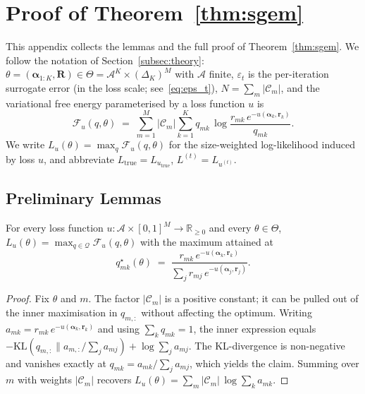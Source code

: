 \section{Proof of Theorem~\ref{thm:sgem}}
\label{sec:proof}

This appendix collects the lemmas and the full proof of
Theorem~\ref{thm:sgem}. We follow the notation of
Section~\ref{subsec:theory}: $\theta = (\boldsymbol{\alpha}_{1:K}, \mathbf{R})
\in \Theta = \mathcal{A}^K \times (\Delta_K)^M$ with $\mathcal{A}$
finite, $\varepsilon_t$ is the per-iteration surrogate error
(in the loss scale; see~\eqref{eq:eps_t}), $N = \sum_m |\mathcal{C}_m|$,
and the variational free energy
parameterised by a loss function $u$ is
\begin{equation*}
\mathcal{F}_u(q, \theta) \;=\; \sum_{m=1}^{M} |\mathcal{C}_m|
\sum_{k=1}^{K} q_{mk}\, \log \frac{r_{mk}\, e^{-u(\boldsymbol{\alpha}_k, \mathbf{r}_k)}}{q_{mk}}.
\end{equation*}
We write $L_u(\theta) = \max_q \mathcal{F}_u(q, \theta)$ for the
size-weighted log-likelihood induced by loss $u$, and abbreviate
$L_{\mathrm{true}} = L_{u_{\mathrm{true}}}$,
$L^{(t)} = L_{u^{(t)}}$.

\subsection{Preliminary Lemmas}

\begin{proposition}
\label{prop:elbo}
For every loss function $u: \mathcal{A} \times [0, 1]^M \to \mathbb{R}_{\geq 0}$
and every $\theta\in\Theta$,
$L_u(\theta) = \max_{q\in\mathcal{Q}} \mathcal{F}_u(q, \theta)$ with
the maximum attained at
\begin{equation*}
q^{\star}_{mk}(\theta) \;=\; \frac{r_{mk}\,e^{-u(\boldsymbol{\alpha}_k, \mathbf{r}_k)}}
{\sum_{j} r_{mj}\,e^{-u(\boldsymbol{\alpha}_j, \mathbf{r}_j)}}.
\end{equation*}
\end{proposition}

\begin{proof}
Fix $\theta$ and $m$. The factor $|\mathcal{C}_m|$ is a positive
constant; it can be pulled out of the inner maximisation in $q_{m,:}$
without affecting the optimum. Writing $a_{mk} = r_{mk}\,
e^{-u(\boldsymbol{\alpha}_k, \mathbf{r}_k)}$ and using
$\sum_k q_{mk} = 1$, the inner expression equals
$-\mathrm{KL}(q_{m,:} \| a_{m,:}/\!\sum_j a_{mj}) + \log\sum_j a_{mj}$.
The KL-divergence is non-negative and vanishes exactly at
$q_{mk} = a_{mk}/\sum_j a_{mj}$, which yields the claim. Summing
over $m$ with weights $|\mathcal{C}_m|$ recovers
$L_u(\theta) = \sum_m |\mathcal{C}_m|\,\log\sum_k a_{mk}$.
\end{proof}

